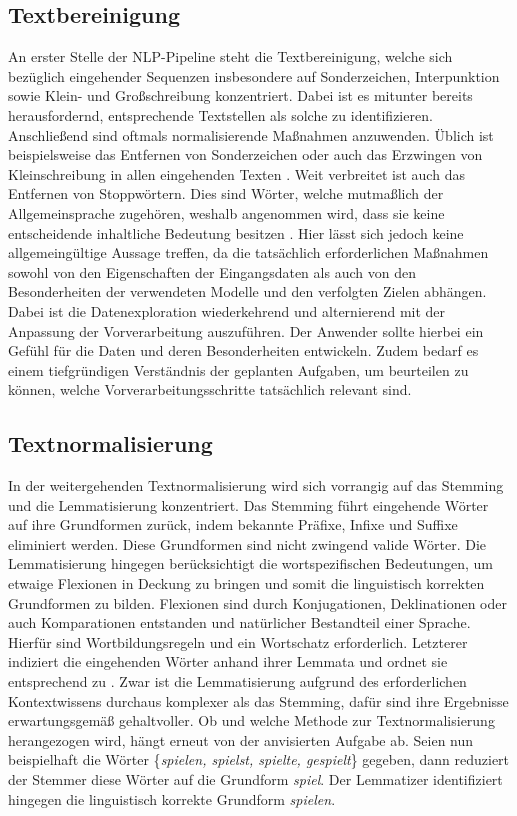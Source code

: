 \subsection{Textbereinigung}
\noindent
An erster Stelle der \ac{NLP}-Pipeline steht die Textbereinigung, welche sich bezüglich eingehender Sequenzen insbesondere auf Sonderzeichen, Interpunktion sowie Klein- und Großschreibung konzentriert. Dabei ist es mitunter bereits herausfordernd, entsprechende Textstellen als solche zu identifizieren. Anschließend sind oftmals normalisierende Maßnahmen anzuwenden. Üblich ist beispielsweise das Entfernen von Sonderzeichen oder auch das Erzwingen von Kleinschreibung in allen eingehenden Texten \cite[S.~107]{BIR09}. Weit verbreitet ist auch das Entfernen von Stoppwörtern. Dies sind Wörter, welche mutmaßlich der Allgemeinsprache zugehören, weshalb angenommen wird, dass sie keine entscheidende inhaltliche Bedeutung besitzen \cite[S.~5]{GAM16}. Hier lässt sich jedoch keine allgemeingültige Aussage treffen, da die tatsächlich erforderlichen Maßnahmen sowohl von den Eigenschaften der Eingangsdaten als auch von den Besonderheiten der verwendeten Modelle und den verfolgten Zielen abhängen. Dabei ist die Datenexploration wiederkehrend und alternierend mit der Anpassung der Vorverarbeitung auszuführen. Der Anwender sollte hierbei ein Gefühl für die Daten und deren Besonderheiten entwickeln. Zudem bedarf es einem tiefgründigen Verständnis der geplanten Aufgaben, um beurteilen zu können, welche Vorverarbeitungsschritte tatsächlich relevant sind.


\subsection{Textnormalisierung}
\noindent
In der weitergehenden Textnormalisierung wird sich vorrangig auf das Stemming und die Lemmatisierung konzentriert. Das Stemming führt eingehende Wörter auf ihre Grundformen zurück, indem bekannte Präfixe, Infixe und Suffixe eliminiert werden. Diese Grundformen sind nicht zwingend valide Wörter. Die Lemmatisierung hingegen berücksichtigt die wortspezifischen Bedeutungen, um etwaige Flexionen in Deckung zu bringen und somit die linguistisch korrekten Grundformen zu bilden. Flexionen sind durch Konjugationen, Deklinationen oder auch Komparationen entstanden und natürlicher Bestandteil einer Sprache. Hierfür sind Wortbildungsregeln und ein Wortschatz erforderlich. Letzterer indiziert die eingehenden Wörter anhand ihrer Lemmata und ordnet sie entsprechend zu \cite[S.~107-108]{BIR09}. Zwar ist die Lemmatisierung aufgrund des erforderlichen Kontextwissens durchaus komplexer als das Stemming, dafür sind ihre Ergebnisse erwartungsgemäß gehaltvoller. Ob und welche Methode zur Textnormalisierung herangezogen wird, hängt erneut von der anvisierten Aufgabe ab. Seien nun beispielhaft die Wörter \{\textit{spielen, spielst, spielte, gespielt}\} gegeben, dann reduziert der Stemmer diese Wörter auf die Grundform \textit{spiel}. Der Lemmatizer identifiziert hingegen die linguistisch korrekte Grundform \textit{spielen}.\\

